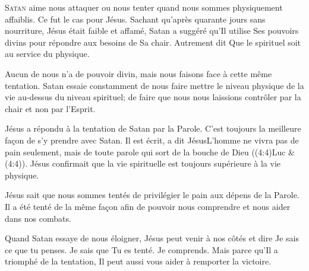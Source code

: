 

\lettrine{S}{atan} aime nous attaquer ou nous tenter
 quand nous sommes physiquement affaiblis.
 Ce fut le cas pour Jésus. Sachant qu'après quarante jours sans nourriture,
 Jésus était faible et affamé, Satan a suggéré qu'Il utilise
 Ses pouvoirs divins pour répondre aux besoins de Sa chair.
 Autrement dit\frcolon{} 
 \Og Que le spirituel soit au service du physique. \Fg{}

Aucun de nous n'a de pouvoir divin, mais nous faisons face
 à cette même tentation. Satan essaie constamment de nous faire mettre
 le niveau physique de la vie au-dessus du niveau spirituel;
 de faire que nous nous laissions contrôler 
 par la chair et non par l'Esprit.

Jésus a répondu à la tentation de Satan par la Parole.
 C'est toujours la meilleure fa\c{c}on de s'y prendre avec Satan.
 \Og Il est écrit, a dit Jésus\frcolon L'homme ne vivra pas de pain seulement,
 mais de toute parole qui sort de la bouche de Dieu \Fg{}
 ((4:4)Luc \& (4:4)).
 Jésus confirmait que la vie spirituelle est toujours supérieure
 à la vie physique.


Jésus sait que nous sommes tentés de privilégier le pain aux dépens
 de la Parole. Il a été tenté de la même fa\c{c}on afin de pouvoir 
 nous comprendre et nous aider dans nos combats.

Quand Satan essaye de nous éloigner, Jésus peut venir à nos côtés
 et dire\frcolon{} 
 \Og Je sais ce que tu penses. Je sais que Tu es tenté. Je comprends. \Fg{}
 Mais parce qu'Il a triomphé de la tentation, Il peut aussi vous aider
 à remporter la victoire.

\dvrule



